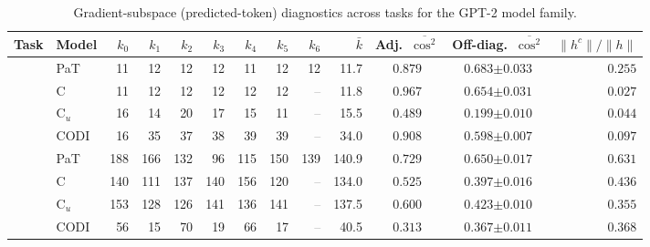 \begin{table}[h!]
\centering
\small
\setlength{\tabcolsep}{2.5pt}
\caption{Gradient-subspace (predicted-token) diagnostics across tasks for the GPT-2 model family.}
\label{tab:subspace_geometry_gpt2_pred}
\begin{tabular}{llrrrrrrrrccr}
\toprule
Task & Model & $k_{0}$ & $k_{1}$ & $k_{2}$ & $k_{3}$ & $k_{4}$ & $k_{5}$ & $k_{6}$ & $\bar k$ & Adj.\ $\overline{\cos^2}$ & Off-diag.\ $\overline{\cos^2}$ & $\|h^c\|/\|h\|$ \\
\midrule
{} & PaT & 11 & 12 & 12 & 12 & 11 & 12 & 12 & 11.7 & $0.879$ & $0.683 {\scriptstyle \pm 0.033}$ & $0.255$ \\
 & C & 11 & 12 & 12 & 12 & 12 & 12 & \textcolor{gray}{--} & 11.8 & $0.967$ & $0.654 {\scriptstyle \pm 0.031}$ & $0.027$ \\
 & C$_u$ & 16 & 14 & 20 & 17 & 15 & 11 & \textcolor{gray}{--} & 15.5 & $0.489$ & $0.199 {\scriptstyle \pm 0.010}$ & $0.044$ \\
 & CODI & 16 & 35 & 37 & 38 & 39 & 39 & \textcolor{gray}{--} & 34.0 & $0.908$ & $0.598 {\scriptstyle \pm 0.007}$ & $0.097$ \\
\midrule
{} & PaT & 188 & 166 & 132 & 96 & 115 & 150 & 139 & 140.9 & $0.729$ & $0.650 {\scriptstyle \pm 0.017}$ & $0.631$ \\
 & C & 140 & 111 & 137 & 140 & 156 & 120 & \textcolor{gray}{--} & 134.0 & $0.525$ & $0.397 {\scriptstyle \pm 0.016}$ & $0.436$ \\
 & C$_u$ & 153 & 128 & 126 & 141 & 136 & 141 & \textcolor{gray}{--} & 137.5 & $0.600$ & $0.423 {\scriptstyle \pm 0.010}$ & $0.355$ \\
 & CODI & 56 & 15 & 70 & 19 & 66 & 17 & \textcolor{gray}{--} & 40.5 & $0.313$ & $0.367 {\scriptstyle \pm 0.011}$ & $0.368$ \\
\bottomrule
\end{tabular}
\end{table}